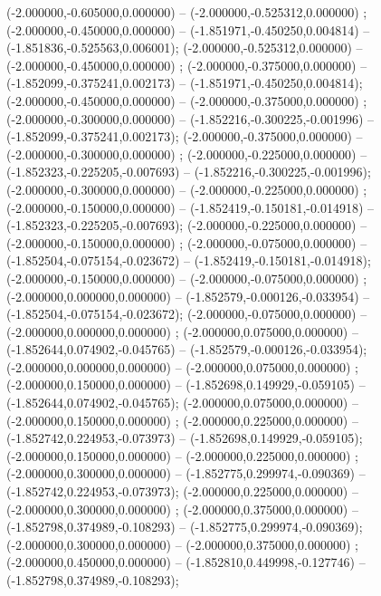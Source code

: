  (-2.000000,-0.605000,0.000000) -- (-2.000000,-0.525312,0.000000) ;
 (-2.000000,-0.450000,0.000000) -- (-1.851971,-0.450250,0.004814) -- (-1.851836,-0.525563,0.006001);
 (-2.000000,-0.525312,0.000000) -- (-2.000000,-0.450000,0.000000) ;
 (-2.000000,-0.375000,0.000000) -- (-1.852099,-0.375241,0.002173) -- (-1.851971,-0.450250,0.004814);
 (-2.000000,-0.450000,0.000000) -- (-2.000000,-0.375000,0.000000) ;
 (-2.000000,-0.300000,0.000000) -- (-1.852216,-0.300225,-0.001996) -- (-1.852099,-0.375241,0.002173);
 (-2.000000,-0.375000,0.000000) -- (-2.000000,-0.300000,0.000000) ;
 (-2.000000,-0.225000,0.000000) -- (-1.852323,-0.225205,-0.007693) -- (-1.852216,-0.300225,-0.001996);
 (-2.000000,-0.300000,0.000000) -- (-2.000000,-0.225000,0.000000) ;
 (-2.000000,-0.150000,0.000000) -- (-1.852419,-0.150181,-0.014918) -- (-1.852323,-0.225205,-0.007693);
 (-2.000000,-0.225000,0.000000) -- (-2.000000,-0.150000,0.000000) ;
 (-2.000000,-0.075000,0.000000) -- (-1.852504,-0.075154,-0.023672) -- (-1.852419,-0.150181,-0.014918);
 (-2.000000,-0.150000,0.000000) -- (-2.000000,-0.075000,0.000000) ;
 (-2.000000,0.000000,0.000000) -- (-1.852579,-0.000126,-0.033954) -- (-1.852504,-0.075154,-0.023672);
 (-2.000000,-0.075000,0.000000) -- (-2.000000,0.000000,0.000000) ;
 (-2.000000,0.075000,0.000000) -- (-1.852644,0.074902,-0.045765) -- (-1.852579,-0.000126,-0.033954);
 (-2.000000,0.000000,0.000000) -- (-2.000000,0.075000,0.000000) ;
 (-2.000000,0.150000,0.000000) -- (-1.852698,0.149929,-0.059105) -- (-1.852644,0.074902,-0.045765);
 (-2.000000,0.075000,0.000000) -- (-2.000000,0.150000,0.000000) ;
 (-2.000000,0.225000,0.000000) -- (-1.852742,0.224953,-0.073973) -- (-1.852698,0.149929,-0.059105);
 (-2.000000,0.150000,0.000000) -- (-2.000000,0.225000,0.000000) ;
 (-2.000000,0.300000,0.000000) -- (-1.852775,0.299974,-0.090369) -- (-1.852742,0.224953,-0.073973);
 (-2.000000,0.225000,0.000000) -- (-2.000000,0.300000,0.000000) ;
 (-2.000000,0.375000,0.000000) -- (-1.852798,0.374989,-0.108293) -- (-1.852775,0.299974,-0.090369);
 (-2.000000,0.300000,0.000000) -- (-2.000000,0.375000,0.000000) ;
 (-2.000000,0.450000,0.000000) -- (-1.852810,0.449998,-0.127746) -- (-1.852798,0.374989,-0.108293);
